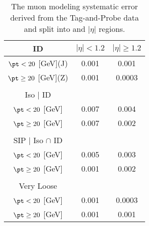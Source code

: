 \begin{table}[htbp]
\centering
\caption{The muon modeling systematic error derived from the Tag-and-Probe data and split into \pt and $|\eta|$ regions. }
\label{tab:musysttable}
\begin{tabular}{|c|cc|}
\hline
ID & $|\eta|<1.2$ & $|\eta|\geq 1.2$  \\
\hline
$\pt < 20$ [GeV](J) & 0.001 & 0.001  \\

$\pt \geq 20$ [GeV](Z) &  0.001& 0.0003 \\

 &  & \\
\hline
Iso $|$ ID  &  &  \\
\hline
$\pt < 20$ [GeV]  & 0.007 & 0.004  \\

$\pt \geq 20$ [GeV] & 0.007 & 0.002  \\

 &  &  \\
\hline
SIP $|$ Iso $\cap$ ID &  &  \\
\hline
$\pt < 20$ [GeV]& 0.005 & 0.003 \\

$\pt \geq 20$ [GeV]& 0.001 & 0.002 \\
 & &  \\
\hline
Very Loose & &  \\
\hline
$\pt < 20 $ [GeV]  & 0.001 & 0.0003 \\
$\pt \geq 20$ [GeV]  & 0.001 & 0.001 \\
\hline
\end{tabular}
\label{tab:musyst}
\end{table}


